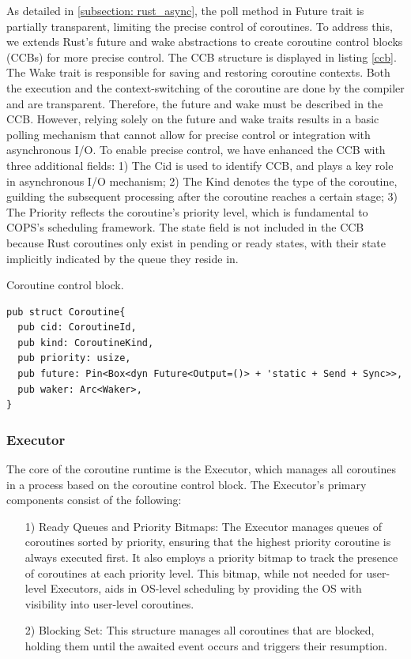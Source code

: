\documentclass[conference]{IEEEtran}
\begin{document}
As detailed in \ref{subsection: rust_async}, the poll method in Future trait is partially transparent, limiting the precise control of coroutines. To address this, we extends Rust's future and wake abstractions to create coroutine control blocks (CCBs) for more precise control. The CCB structure is displayed in listing \ref{ccb}. The Wake trait is responsible for saving and restoring coroutine contexts. Both the execution and the context-switching of the coroutine are done by the compiler and are transparent. Therefore, the future and wake must be described in the CCB. However, relying solely on the future and wake traits results in a basic polling mechanism that cannot allow for precise control or integration with asynchronous I/O. To enable precise control, we have enhanced the CCB with three additional fields: 1) The Cid is used to identify CCB, and plays a key role in asynchronous I/O mechanism; 2) The Kind denotes the type of the coroutine, guilding the subsequent processing after the coroutine reaches a certain stage; 3) The Priority reflects the coroutine's priority level, which is fundamental to COPS's scheduling framework. The state field is not included in the CCB because Rust coroutines only exist in pending or ready states, with their state implicitly indicated by the queue they reside in.


\begin{listing}
\caption{Coroutine control block.}
\label{ccb}
\begin{mdframed}
\begin{verbatim}
pub struct Coroutine{
  pub cid: CoroutineId,
  pub kind: CoroutineKind,
  pub priority: usize,
  pub future: Pin<Box<dyn Future<Output=()> + 'static + Send + Sync>>, 
  pub waker: Arc<Waker>,
}
\end{verbatim}
\end{mdframed}
\end{listing}

\subsubsection{Executor}
\label{subsubsection: executor}

The core of the coroutine runtime is the Executor, which manages all coroutines in a process based on the coroutine control block. The Executor's primary components consist of the following:

\begin{itemize}[leftmargin=*]
    \item[1)] Ready Queues and Priority Bitmaps: The Executor manages queues of coroutines sorted by priority, ensuring that the highest priority coroutine is always executed first. It also employs a priority bitmap to track the presence of coroutines at each priority level. This bitmap, while not needed for user-level Executors, aids in OS-level scheduling by providing the OS with visibility into user-level coroutines.
    \item[2)] Blocking Set: This structure manages all coroutines that are blocked, holding them until the awaited event occurs and triggers their resumption.
\end{itemize}
\end{document}
